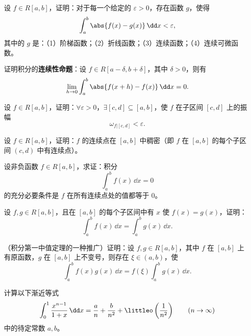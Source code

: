 \begin{xreferenceproblem}[5]
设 $f\in R[a,b]$，证明：对于每一个给定的 $\varepsilon>0$，存在函数 $g$，使得
\[
  \int_a^b\abs{f(x)-g(x)}\,\dd x<\varepsilon,
\]
其中的 $g$ 是：（1）阶梯函数；（2）折线函数；（3）连续函数；（4）连续可微函数。
\end{xreferenceproblem}

\begin{xreferenceproblem}[6]
证明积分的\textbf{连续性命题}：设 $f\in R[a-\delta,b+\delta]$，其中 $\delta>0$，则有
\[
  \lim_{h\to0}\int_a^b\abs{f(x+h)-f(x)}\,\dd x=0.
\]
\end{xreferenceproblem}

\begin{xreferenceproblem}[7]
设 $f\in R[a,b]$，证明：$\forall\varepsilon>0$，$\exists[c,d]\subseteq[a,b]$，使 $f$ 在子区间 $[c,d]$ 上的振幅
\[
  \omega_{f|[c,d]}<\varepsilon.
\]
\end{xreferenceproblem}

\begin{xreferenceproblem}[8]
设 $f\in R[a,b]$，证明：$f$ 的连续点在 $[a,b]$ 中稠密（即 $f$ 在 $[a,b]$ 的每个子区间 $(c,d)$ 中有连续点）。
\end{xreferenceproblem}

\begin{xreferenceproblem}[9]
设非负函数 $f\in R[a,b]$，求证：积分
\[
  \int_a^b f(x)\,\dd x=0
\]
的充分必要条件是 $f$ 在所有连续点处的值都等于 0。
\end{xreferenceproblem}

\begin{xreferenceproblem}[10]
设 $f,g\in R[a,b]$，且在 $[a,b]$ 的每个子区间中有 $x$ 使 $f(x)=g(x)$，证明：
\[
  \int_a^b f(x)\,\dd x=\int_a^b g(x)\,\dd x.
\]
\end{xreferenceproblem}

\begin{xreferenceproblem}[11]
（积分第一中值定理的一种推广）证明：设 $f,g\in R[a,b]$，其中 $f$ 在 $[a,b]$ 上有原函数，$g$ 在 $[a,b]$ 上不变号，则存在 $\xi\in(a,b)$，使
\[
  \int_a^b f(x)g(x)\,\dd x=f(\xi)\int_a^b g(x)\,\dd x.
\]
\end{xreferenceproblem}

\begin{xreferenceproblem}[12]
计算以下渐近等式
\[
  \int_0^1\frac{x^{n-1}}{1+x}\,\dd x
  =\frac an+\frac b{n^2}+\littleo\left(\frac1{n^2}\right)
  \qquad(n\to\infty)
\]
中的待定常数 $a,b$。
\end{xreferenceproblem}

